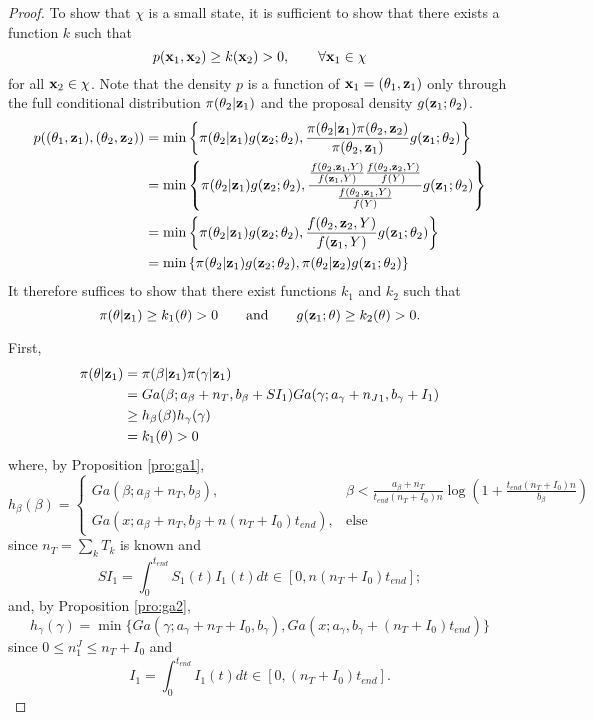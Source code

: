 \documentclass[11pt]{article}
\begin{document}
\begin{proof}
	To show that $\chi$ is a small state, it is sufficient to show that there exists a function $k$ such that
	$$p(\mathbf{x}_1, \mathbf{x}_2) \ge k(\mathbf{x}_2) > 0, \qquad \forall \mathbf{x}_1 \in \chi $$
	for all $\mathbf{x}_2 \in \chi$.
	Note that the density $p$ is a function of $\mathbf{x}_1 = (\theta_1, \mathbf{z}_1)$ only through the full conditional distribution $\pi(\theta_2| \mathbf{z}_1)$ and the proposal density $g(\mathbf{z}_1; \theta_2)$.
	\begin{align*}
		p((\theta_1, \mathbf{z}_1), (\theta_2, \mathbf{z}_2))
		& = \min\left\lbrace \pi(\theta_2| \mathbf{z}_1)g(\mathbf{z}_2; \theta_2), \dfrac{\pi(\theta_2| \mathbf{z}_1) \pi(\theta_2, \mathbf{z}_2)}{\pi(\theta_2, \mathbf{z}_1)} g(\mathbf{z}_1; \theta_2) \right\rbrace \\
		& = \min\left\lbrace \pi(\theta_2| \mathbf{z}_1)g(\mathbf{z}_2; \theta_2),
		\dfrac{
			\frac{f(\theta_2, \mathbf{z}_1, Y)}{f(\mathbf{z}_1, Y)}
			\frac{f(\theta_2, \mathbf{z}_2, Y)}{f(Y)}
		}{\frac{f(\theta_2, \mathbf{z}_1, Y)}{f(Y)}} 
		g(\mathbf{z}_1; \theta_2)\right\rbrace \\
		& = \min\left\lbrace \pi(\theta_2| \mathbf{z}_1)g(\mathbf{z}_2; \theta_2),
		\dfrac{f(\theta_2, \mathbf{z}_2, Y)}{f(\mathbf{z}_1, Y)}
		g(\mathbf{z}_1; \theta_2)\right\rbrace \\
		& = \min\left\lbrace \pi(\theta_2| \mathbf{z}_1)g(\mathbf{z}_2; \theta_2),
		\pi(\theta_2| \mathbf{z}_2)
		g(\mathbf{z}_1; \theta_2)\right\rbrace
	\end{align*}
It therefore suffices to show that there exist functions $k_1$ and $k_2$ such that
$$\pi(\theta| \mathbf{z}_1) \ge k_1(\theta) > 0 \qquad \text{and} \qquad  g(\mathbf{z}_1; \theta) \ge k_2(\theta) > 0.$$

	First, 
	\begin{align*}
		\pi(\theta| \mathbf{z}_1) 
		& = \pi(\beta| \mathbf{z}_1) \pi(\gamma| \mathbf{z}_1)  \\
		& = Ga(\beta; a_{\beta} + n_T, b_{\beta} + SI_1) Ga(\gamma; a_{\gamma} + {n_J}_1, b_{\gamma} + I_1) \\
		& \ge h_{\beta}(\beta) h_{\gamma}(\gamma) \\
		& = k_1(\theta) > 0
	\end{align*}
	where, by Proposition \ref{pro:ga1},
	$$h_{\beta}(\beta) = \begin{cases}
		Ga(\beta;a_{\beta}+n_T,b_{\beta}), & \beta<\frac{a_{\beta}+n_T}{t_{end}(n_T+I_0) n} \log \left( 1 + \frac{t_{end}(n_T+I_0) n}{b_{\beta}}\right) \\ Ga(x;a_{\beta}+n_T,b_{\beta}+n(n_T+I_0) t_{end}), & \text{else}
	\end{cases}$$
since $n_T = \sum_k T_k$ is known and 
$$SI_1 = \int_{0}^{t_{end}}S_1(t)I_1(t)dt \in [0, n (n_T+I_0) t_{end}];$$
and, by Proposition \ref{pro:ga2},
	$$h_{\gamma}(\gamma) = \min\{
		Ga(\gamma;a_{\gamma}+n_T+I_0,b_{\gamma}), Ga(x;a_{\gamma},b_{\gamma}+(n_T+I_0) t_{end})\}
		$$
since $0\le n_1^J \le n_T + I_0$ and
$$I_1 = \int_{0}^{t_{end}}I_1(t)dt \in [0, (n_T+I_0) t_{end}].$$
	

\end{proof}
\end{document}
